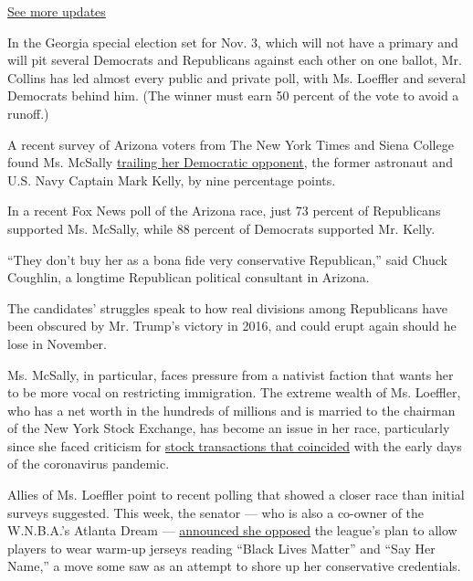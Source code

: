 \href{https://www.nytimes.com/2020/07/31/us/elections/biden-vs-trump.html?action=click\&pgtype=Article\&state=default\&region=MAIN_CONTENT_1\&context=storylines_live_updates}{See
more updates}

In the Georgia special election set for Nov. 3, which will not have a
primary and will pit several Democrats and Republicans against each
other on one ballot, Mr. Collins has led almost every public and private
poll, with Ms. Loeffler and several Democrats behind him. (The winner
must earn 50 percent of the vote to avoid a runoff.)

A recent survey of Arizona voters from The New York Times and Siena
College found Ms. McSally
\href{https://www.nytimes.com/2020/06/25/us/politics/trump-senate-republicans-poll.html}{trailing
her Democratic opponent}, the former astronaut and U.S. Navy Captain
Mark Kelly, by nine percentage points.

In a recent Fox News poll of the Arizona race, just 73 percent of
Republicans supported Ms. McSally, while 88 percent of Democrats
supported Mr. Kelly.

``They don't buy her as a bona fide very conservative Republican,'' said
Chuck Coughlin, a longtime Republican political consultant in Arizona.

The candidates' struggles speak to how real divisions among Republicans
have been obscured by Mr. Trump's victory in 2016, and could erupt again
should he lose in November.

Ms. McSally, in particular, faces pressure from a nativist faction that
wants her to be more vocal on restricting immigration. The extreme
wealth of Ms. Loeffler, who has a net worth in the hundreds of millions
and is married to the chairman of the New York Stock Exchange, has
become an issue in her race, particularly since she faced criticism for
\href{https://www.nytimes.com/2020/05/26/us/politics/senators-stock-trades-investigation.html}{stock
transactions that coincided} with the early days of the coronavirus
pandemic.

Allies of Ms. Loeffler point to recent polling that showed a closer race
than initial surveys suggested. This week, the senator --- who is also a
co-owner of the W.N.B.A.'s Atlanta Dream ---
\href{https://www.ajc.com/blog/politics/loeffler-opposes-wnba-plan-spread-black-lives-matter-message/ybTbHIpzZx7dbRlz3sfLiM/}{announced
she opposed} the league's plan to allow players to wear warm-up jerseys
reading ``Black Lives Matter'' and ``Say Her Name,'' a move some saw as
an attempt to shore up her conservative credentials.


